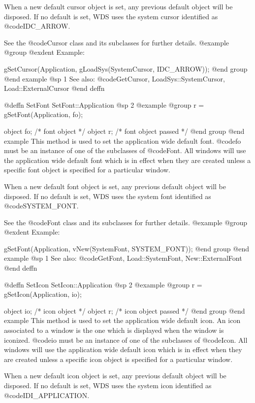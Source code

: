 When a new default cursor object is set, any previous default object
will be disposed.  If no default is set, WDS uses the system cursor
identified as @code{IDC_ARROW}.

See the @code{Cursor} class and its subclasses for further details.
@example
@group
@exdent Example:

gSetCursor(Application, gLoadSys(SystemCursor, IDC_ARROW));
@end group
@end example
@sp 1
See also:  @code{GetCursor, LoadSys::SystemCursor, Load::ExternalCursor}
@end deffn



@deffn {SetFont} SetFont::Application
@sp 2
@example
@group
r = gSetFont(Application, fo);

object  fo;     /*  font object         */
object  r;      /*  font object passed  */
@end group
@end example
This method is used to set the application wide default font.
@code{fo} must be an instance of one of the subclasses of @code{Font}.
All windows will use the application wide default font which is in
effect when they are created unless a specific font object is
specified for a particular window.

When a new default font object is set, any previous default object
will be disposed.  If no default is set, WDS uses the system font
identified as @code{SYSTEM_FONT}.

See the @code{Font} class and its subclasses for further details.
@example
@group
@exdent Example:

gSetFont(Application, vNew(SystemFont, SYSTEM_FONT));
@end group
@end example
@sp 1
See also:  @code{GetFont, Load::SystemFont, New::ExternalFont}
@end deffn



@deffn {SetIcon} SetIcon::Application
@sp 2
@example
@group
r = gSetIcon(Application, io);

object  io;     /*  icon object         */
object  r;      /*  icon object passed  */
@end group
@end example
This method is used to set the application wide default icon.  An icon
associated to a window is the one which is displayed when the window is
iconized.  @code{io} must be an instance of one of the subclasses of
@code{Icon}.  All windows will use the application wide default icon
which is in effect when they are created unless a specific icon object
is specified for a particular window.

When a new default icon object is set, any previous default object
will be disposed.  If no default is set, WDS uses the system icon
identified as @code{IDI_APPLICATION}.


